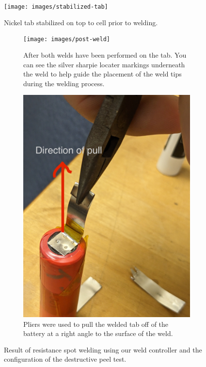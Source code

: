 \documentclass{article}
\begin{document}
\begin{figure}[h]
\centering
\texttt{[image: images/stabilized-tab]}
\caption{Nickel tab stabilized on top to cell prior to welding.}
\label{fig:stabilized-tab}
\end{figure}

\begin{figure}[h]
\centering
\begin{subfigure}{0.6\textwidth}
\texttt{[image: images/post-weld]}
\caption{After both welds have been performed on the tab. You can see the silver sharpie locater markings underneath the weld to help guide the placement of the weld tips during the welding process.}
\label{fig:post-weld}
\end{subfigure}
\hfill
\begin{subfigure}{0.3\textwidth}
\includegraphics[width=\textwidth]{images/direction-of-pull}
\caption{Pliers were used to pull the welded tab off of the battery at a right angle to the surface of the weld.}
\label{fig:pull-config}
\end{subfigure}
\caption{Result of resistance spot welding using our weld controller and the configuration of the destructive peel test.}
\end{figure}
\end{document}
